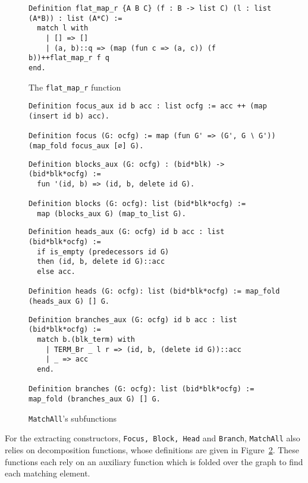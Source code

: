 \documentclass[11pt]{article}
\newcommand{\inlinecoq}[1]{\mbox{\lstinline[style=customcoq,columns=fixed,basewidth=.48em]{#1}}}
\newcommand{\ilc}[1]{\inlinecoq{#1}}
\begin{document}
\begin{figure}
  \begin{lstlisting}[style=customcoq,basicstyle=\small\ttfamily]
Definition flat_map_r {A B C} (f : B -> list C) (l : list (A*B)) : list (A*C) :=
  match l with
    | [] => []
    | (a, b)::q => (map (fun c => (a, c)) (f b))++flat_map_r f q
end.
  \end{lstlisting}
  \caption{The \ilc{flat_map_r} function}
  \label{fig:flatmap}
\end{figure}
\begin{figure}
  \begin{lstlisting}[style=customcoq,basicstyle=\small\ttfamily]
Definition focus_aux id b acc : list ocfg := acc ++ (map (insert id b) acc).

Definition focus (G: ocfg) := map (fun G' => (G', G ∖ G')) (map_fold focus_aux [∅] G).
  \end{lstlisting}
  
  \begin{lstlisting}[style=customcoq,basicstyle=\small\ttfamily]
Definition blocks_aux (G: ocfg) : (bid*blk) -> (bid*blk*ocfg) :=
  fun '(id, b) => (id, b, delete id G).

Definition blocks (G: ocfg): list (bid*blk*ocfg) :=
  map (blocks_aux G) (map_to_list G).
  \end{lstlisting}
  
  \begin{lstlisting}[style=customcoq,basicstyle=\small\ttfamily]
Definition heads_aux (G: ocfg) id b acc : list (bid*blk*ocfg) :=
  if is_empty (predecessors id G)
  then (id, b, delete id G)::acc
  else acc.

Definition heads (G: ocfg): list (bid*blk*ocfg) := map_fold (heads_aux G) [] G.
  \end{lstlisting}
  
  \begin{lstlisting}[style=customcoq,basicstyle=\small\ttfamily]
Definition branches_aux (G: ocfg) id b acc : list (bid*blk*ocfg) :=
  match b.(blk_term) with
    | TERM_Br _ l r => (id, b, (delete id G))::acc
    | _ => acc
  end.

Definition branches (G: ocfg): list (bid*blk*ocfg) := map_fold (branches_aux G) [] G.
  \end{lstlisting}
  \caption{\ilc{MatchAll}'s subfunctions}
  \label{fig:match_sub_funs}
\end{figure}

For the extracting constructors, \ilc{Focus, Block, Head} and \ilc{Branch}, \ilc{MatchAll} also relies on decomposition functions, whose definitions are given in Figure~\ref{fig:match_sub_funs}. These functions each rely on an auxiliary function which is folded over the graph to find each matching element.
\end{document}
